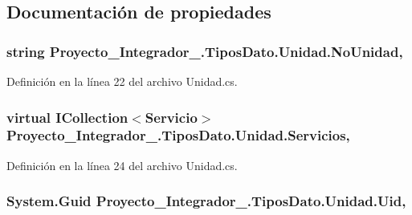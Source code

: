 \subsection{Documentación de propiedades}
\hypertarget{class_proyecto___integrador__3_1_1_tipos_dato_1_1_unidad_a75d59e9f06c1422def3f8630d2a33642}{
\subsubsection[{No\-Unidad}]{\setlength{\rightskip}{0pt plus 5cm}string Proyecto\-\_\-\-Integrador\-\_.\-Tipos\-Dato.\-Unidad.\-No\-Unidad\hspace{0.3cm}{\ttfamily [get]}, {\ttfamily [set]}}}\label{class_proyecto___integrador__3_1_1_tipos_dato_1_1_unidad_a75d59e9f06c1422def3f8630d2a33642}


Definición en la línea 22 del archivo Unidad.\-cs.

\hypertarget{class_proyecto___integrador__3_1_1_tipos_dato_1_1_unidad_aca85e685e50da0af6be67e3ee69b1bb1}{
\subsubsection[{Servicios}]{\setlength{\rightskip}{0pt plus 5cm}virtual I\-Collection$<${\bf Servicio}$>$ Proyecto\-\_\-\-Integrador\-\_.\-Tipos\-Dato.\-Unidad.\-Servicios\hspace{0.3cm}{\ttfamily [get]}, {\ttfamily [set]}}}\label{class_proyecto___integrador__3_1_1_tipos_dato_1_1_unidad_aca85e685e50da0af6be67e3ee69b1bb1}


Definición en la línea 24 del archivo Unidad.\-cs.

\hypertarget{class_proyecto___integrador__3_1_1_tipos_dato_1_1_unidad_aa2e602251694986f3d519ee3db5ffa38}{
\subsubsection[{Uid}]{\setlength{\rightskip}{0pt plus 5cm}System.\-Guid Proyecto\-\_\-\-Integrador\-\_.\-Tipos\-Dato.\-Unidad.\-Uid\hspace{0.3cm}{\ttfamily [get]}, {\ttfamily [set]}}}\label{class_proyecto___integrador__3_1_1_tipos_dato_1_1_unidad_aa2e602251694986f3d519ee3db5ffa38}


